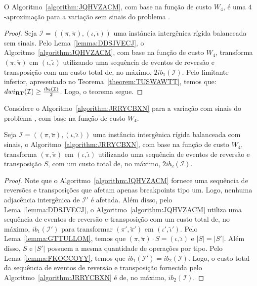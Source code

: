\begin{theorem}\label{theorem:CQXBDUDY}
O Algoritmo~\ref{algorithm:JQHVZACM}, com base na função de custo $W_4$, é uma $4$-aproximação para a variação sem sinais do problema \SbWIRT{}.
\end{theorem}
\begin{proof}
Seja $\mathcal{I} = ((\pi,\breve\pi),(\iota,\breve\iota))$ uma instância intergênica rígida balanceada sem sinais. Pelo Lema~\ref{lemma:DDSJVECJ}, o Algoritmo~\ref{algorithm:JQHVZACM}, com base na função de custo $W_4$, transforma $(\pi,\breve\pi)$ em $(\iota,\breve\iota)$ utilizando uma sequência de eventos de reversão e transposição com um custo total de, no máximo, $2ib_1(\mathcal{I})$. Pelo limitante inferior, apresentado no Teorema~\ref{theorem:TUSWAWTT}, temos que: $dwi_{\textbf{RT}}(\mathcal{I}) \ge \frac{ib_2(\mathcal{I})}{2}$. Logo, o teorema segue.
\end{proof}

Considere o Algoritmo~\ref{algorithm:JRRYCBXN} para a variação com sinais do problema \SbWIRT{}, com base na função de custo $W_4$.



\begin{lemma}\label{lemma:TMZVZPOF}
Seja $\mathcal{I} = ((\pi,\breve\pi),(\iota,\breve\iota))$ uma instância intergênica rígida balanceada com sinais, o Algoritmo~\ref{algorithm:JRRYCBXN}, com base na função de custo $W_4$, transforma $(\pi,\breve\pi)$ em $(\iota,\breve\iota)$ utilizando uma sequência de eventos de reversão e transposição $S$, com um custo total de, no máximo, $2ib_2(\mathcal{I})$.
\end{lemma}
\begin{proof}
Note que o Algoritmo~\ref{algorithm:JQHVZACM} fornece uma sequência de reversões e transposições que afetam apenas breakpoints tipo um. Logo, nenhuma adjacência intergênica de $\mathcal{I'}$ é afetada. Além disso, pelo Lema~\ref{lemma:DDSJVECJ}, o Algoritmo~\ref{algorithm:JQHVZACM} utiliza uma sequência de eventos de reversão e transposição com um custo total de, no máximo, $ib_1(\mathcal{I'})$ para transformar $(\pi',\breve\pi')$ em $(\iota',\breve\iota')$. Pelo Lema~\ref{lemma:GTTULLOM}, temos que $(\pi,\breve\pi) \cdot S = (\iota,\breve\iota)$ e $|S| = |S'|$. Além disso, $S$ e $|S'|$ possuem a mesma quantidade de operações por tipo. Pelo Lema~\ref{lemma:FKOCCOYY}, temos que $ib_1(\mathcal{I'}) = ib_2(\mathcal{I})$. Logo, o custo total da sequência de eventos de reversão e transposição fornecida pelo Algoritmo~\ref{algorithm:JRRYCBXN} é de, no máximo, $ib_2(\mathcal{I})$.
\end{proof}

